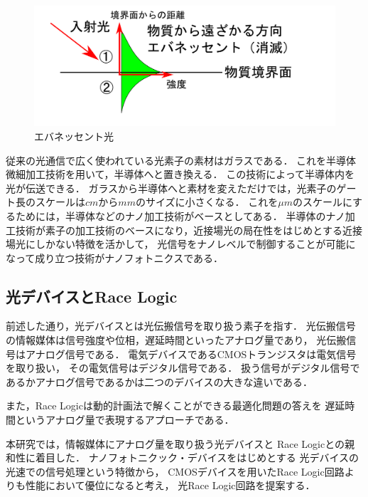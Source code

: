\begin{figure}[t!]
\begin{center}
\includegraphics[keepaspectratio,scale=0.4]{fig/3/evanesent2.pdf}
\caption{エバネッセント光}
\label{fig:eva2}
\end{center}
\end{figure}
従来の光通信で広く使われている光素子の素材はガラスである．
これを半導体微細加工技術を用いて，半導体へと置き換える．
この技術によって半導体内を光が伝送できる．
ガラスから半導体へと素材を変えただけでは，光素子のゲート長のスケールは$cmからmm$のサイズに小さくなる．
これを$ \mu m$のスケールにするためには，半導体などのナノ加工技術がベースとしてある．
半導体のナノ加工技術が素子の加工技術のベースになり，近接場光の局在性をはじめとする近接場光にしかない特徴を活かして，
光信号をナノレベルで制御することが可能になって成り立つ技術がナノフォトニクスである．

\subsection{光デバイスとRace Logic}
前述した通り，光デバイスとは光伝搬信号を取り扱う素子を指す．
光伝搬信号の情報媒体は信号強度や位相，遅延時間といったアナログ量であり，
光伝搬信号はアナログ信号である．
電気デバイスであるCMOSトランジスタは電気信号を取り扱い，
その電気信号はデジタル信号である．
扱う信号がデジタル信号であるかアナログ信号であるかは二つのデバイスの大きな違いである．

また，Race Logicは動的計画法で解くことができる最適化問題の答えを
遅延時間というアナログ量で表現するアプローチである．

本研究では，情報媒体にアナログ量を取り扱う光デバイスと
Race Logicとの親和性に着目した．
ナノフォトニクック・デバイスをはじめとする
光デバイスの光速での信号処理という特徴から，
CMOSデバイスを用いたRace Logic回路よりも性能において優位になると考え，
光Race Logic回路を提案する．

